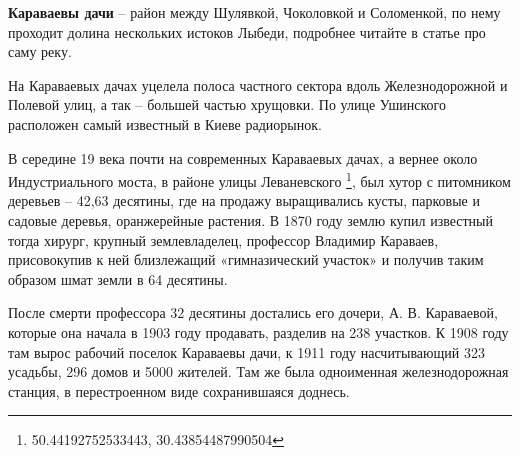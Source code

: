 \medskip

\textbf{Караваевы дачи} – район между Шулявкой, Чоколовкой и Соломенкой, по нему проходит долина нескольких истоков Лыбеди, подробнее читайте в статье про саму реку. 

На Караваевых дачах уцелела полоса частного сектора вдоль Железнодорожной и Полевой улиц, а так – большей частью хрущовки. По улице Ушинского расположен самый известный в Киеве радиорынок.




В середине 19 века почти на современных Караваевых дачах, а вернее около Индустриального моста, в районе улицы Леваневского \footnote{50.44192752533443, 30.43854487990504}, был хутор с питомником деревьев – 42,63 десятины, где на продажу выращивались кусты, парковые и садовые деревья, оранжерейные растения. В 1870 году землю купил известный тогда хирург, крупный землевладелец, профессор Владимир Караваев, присовокупив к ней близлежащий «гимназический участок» и получив таким образом шмат земли в 64 десятины. 

После смерти профессора 32 десятины достались его дочери, А. В. Караваевой, которые она начала в 1903 году продавать, разделив на 238 участков. К 1908 году там вырос рабочий поселок Караваевы дачи, к 1911 году насчитывающий 323 усадьбы, 296 домов и 5000 жителей. Там же была одноименная железнодорожная станция, в перестроенном виде сохранившаяся доднесь.\\ 

